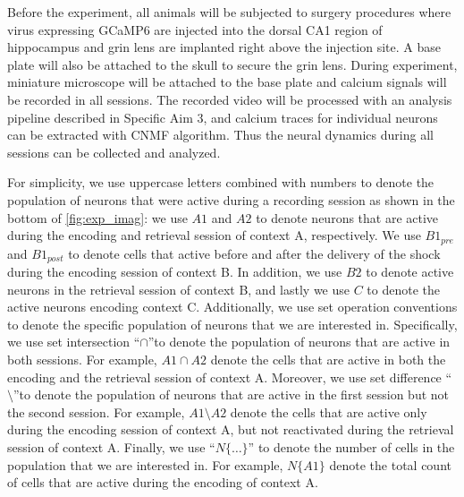 \documentclass[master.tex]{subfiles}
\begin{document}
Before the experiment, all animals will be subjected to surgery procedures where
virus expressing GCaMP6 are injected into the dorsal CA1 region of hippocampus
and grin lens are implanted right above the injection site. A base plate will
also be attached to the skull to secure the grin lens. During experiment,
miniature microscope will be attached to the base plate and calcium signals will
be recorded in all sessions. The recorded video will be processed with an
analysis pipeline described in Specific Aim 3, and calcium traces for individual
neurons can be extracted with CNMF algorithm. Thus the neural dynamics during
all sessions can be collected and analyzed.

For simplicity, we use uppercase letters combined with numbers to denote the
population of neurons that were active during a recording session as shown in
the bottom of \autoref{fig:exp_imag}: we use $A1$ and $A2$ to denote neurons
that are active during the encoding and retrieval session of context A,
respectively. We use $B1_{pre}$ and $B1_{post}$ to denote cells that active
before and after the delivery of the shock during the encoding session of
context B. In addition, we use $B2$ to denote active neurons in the retrieval
session of context B, and lastly we use $C$ to denote the active neurons
encoding context C. Additionally, we use set operation conventions to denote the
specific population of neurons that we are interested in. Specifically, we use
set intersection ``$\cap$''to denote the population of neurons that are active
in both sessions. For example, $A1 \cap A2$ denote the cells that are active in
both the encoding and the retrieval session of context A. Moreover, we use set
difference ``$\setminus$''to denote the population of neurons that are active in
the first session but not the second session. For example, $A1 \setminus A2$
denote the cells that are active only during the encoding session of context A,
but not reactivated during the retrieval session of context A. Finally, we use
``$N\{\ldots\}$'' to denote the number of cells in the population that we are
interested in. For example, $N\{A1\}$ denote the total count of cells that are
active during the encoding of context A.
\end{document}
